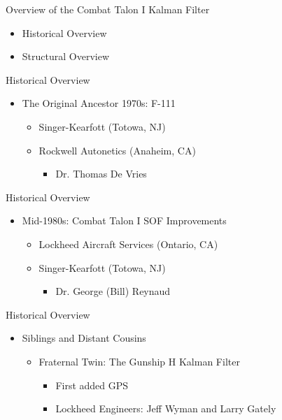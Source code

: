 \begin{frame}
Overview of the Combat Talon I Kalman Filter
\begin{itemize}
  \item Historical Overview
  \item Structural Overview 
\end{itemize} 
\end{frame}

\begin{frame}
Historical Overview
\begin{itemize}
  \item The Original Ancestor 1970s: F-111 
  \begin{itemize}
  \item Singer-Kearfott (Totowa, NJ)
  \item Rockwell Autonetics (Anaheim, CA)
	\begin{itemize}
		\item Dr. Thomas De Vries
	\end{itemize}
  \end{itemize}
\end{itemize} 
\end{frame}

\begin{frame}
Historical Overview
\begin{itemize}
  \item Mid-1980s:  Combat Talon I SOF Improvements
  \begin{itemize}
    \item Lockheed Aircraft Services (Ontario, CA)
    \item Singer-Kearfott (Totowa, NJ)
	\begin{itemize}
		\item Dr. George (Bill) Reynaud
	\end{itemize}
  \end{itemize}
\end{itemize} 
\end{frame}

\begin{frame}
Historical Overview
\begin{itemize}
  \item Siblings and Distant Cousins
  \begin{itemize}
    \item Fraternal Twin: The Gunship H Kalman Filter
	\begin{itemize}
	  \item First added GPS
	  \item Lockheed Engineers: Jeff Wyman and Larry Gately
	\end{itemize} 
  \end{itemize} 
\end{itemize} 
\end{frame}

